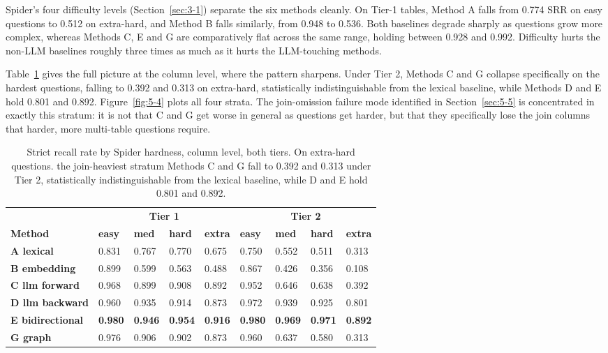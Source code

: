Spider's four difficulty levels (Section~\ref{sec:3-1}) separate the six methods cleanly. On Tier-1 tables, Method A falls from 0.774 SRR on easy questions to 0.512 on extra-hard, and Method B falls similarly, from 0.948 to 0.536. Both baselines degrade sharply as questions grow more complex, whereas Methods C, E and G are comparatively flat across the same range, holding between 0.928 and 0.992. Difficulty hurts the non-LLM baselines roughly three times as much as it hurts the LLM-touching methods.

Table~\ref{tab:5-2} gives the full picture at the column level, where the pattern sharpens. Under Tier 2, Methods C and G collapse specifically on the hardest questions, falling to 0.392 and 0.313 on extra-hard, statistically indistinguishable from the lexical baseline, while Methods D and E hold 0.801 and 0.892. Figure~\ref{fig:5-4} plots all four strata. The join-omission failure mode identified in Section~\ref{sec:5-5} is concentrated in exactly this stratum: it is not that C and G get worse in general as questions get harder, but that they specifically lose the join columns that harder, more multi-table questions require.

\begin{table}[htbp]
\centering
\caption{Strict recall rate by Spider hardness, column level, both tiers. On extra-hard questions. the join-heaviest stratum Methods C and G fall to 0.392 and 0.313 under Tier 2, statistically indistinguishable from the lexical baseline, while D and E hold 0.801 and 0.892.}\label{tab:5-2}
\footnotesize\setlength{\tabcolsep}{4pt}
\begin{tabular}{@{}lllllllll@{}}
\toprule
 & \multicolumn{4}{c}{\footnotesize\textbf{Tier 1}} & \multicolumn{4}{c}{\footnotesize\textbf{Tier 2}}\tabularnewline
\cmidrule(lr){2-5}\cmidrule(lr){6-9}
\textbf{Method} & \textbf{easy} & \textbf{med} & \textbf{hard} & \textbf{extra} & \textbf{easy} & \textbf{med} & \textbf{hard} & \textbf{extra}\tabularnewline
\midrule
\textbf{A lexical} & 0.831 & 0.767 & 0.770 & 0.675 & 0.750 & 0.552 & 0.511 & 0.313\tabularnewline
\textbf{B embedding} & 0.899 & 0.599 & 0.563 & 0.488 & 0.867 & 0.426 & 0.356 & 0.108\tabularnewline
\textbf{C llm forward} & 0.968 & 0.899 & 0.908 & 0.892 & 0.952 & 0.646 & 0.638 & 0.392\tabularnewline
\textbf{D llm backward} & 0.960 & 0.935 & 0.914 & 0.873 & 0.972 & 0.939 & 0.925 & 0.801\tabularnewline
\textbf{E bidirectional} & \textbf{0.980} & \textbf{0.946} & \textbf{0.954} & \textbf{0.916} & \textbf{0.980} & \textbf{0.969} & \textbf{0.971} & \textbf{0.892}\tabularnewline
\textbf{G graph} & 0.976 & 0.906 & 0.902 & 0.873 & 0.960 & 0.637 & 0.580 & 0.313\tabularnewline
\bottomrule
\end{tabular}
\end{table}






